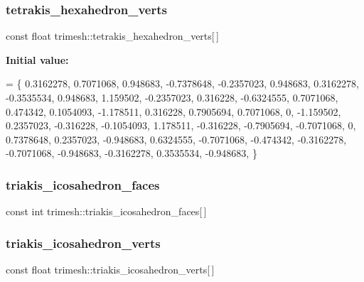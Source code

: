 \subsubsection{\texorpdfstring{tetrakis\+\_\+hexahedron\+\_\+verts}{tetrakis\_hexahedron\_verts}}
{\footnotesize\ttfamily const float trimesh\+::tetrakis\+\_\+hexahedron\+\_\+verts\mbox{[}$\,$\mbox{]}\hspace{0.3cm}{\ttfamily [static]}}

{\bfseries Initial value\+:}
\begin{DoxyCode}
= \{
    0.3162278, 0.7071068, 0.948683,
    -0.7378648, -0.2357023, 0.948683,
    0.3162278, -0.3535534, 0.948683,
    1.159502, -0.2357023, 0.316228,
    -0.6324555, 0.7071068, 0.474342,
    0.1054093, -1.178511, 0.316228,
    0.7905694, 0.7071068, 0,
    -1.159502, 0.2357023, -0.316228,
    -0.1054093, 1.178511, -0.316228,
    -0.7905694, -0.7071068, 0,
    0.7378648, 0.2357023, -0.948683,
    0.6324555, -0.7071068, -0.474342,
    -0.3162278, -0.7071068, -0.948683,
    -0.3162278, 0.3535534, -0.948683,
\}
\end{DoxyCode}
\mbox{\label{namespacetrimesh_a108650043dfd7227ad2df2c75963c957}} 
\subsubsection{\texorpdfstring{triakis\+\_\+icosahedron\+\_\+faces}{triakis\_icosahedron\_faces}}
{\footnotesize\ttfamily const int trimesh\+::triakis\+\_\+icosahedron\+\_\+faces\mbox{[}$\,$\mbox{]}\hspace{0.3cm}{\ttfamily [static]}}

\mbox{\label{namespacetrimesh_acb298922bb8eec3d90a2d866cb4e58a3}} 
\subsubsection{\texorpdfstring{triakis\+\_\+icosahedron\+\_\+verts}{triakis\_icosahedron\_verts}}
{\footnotesize\ttfamily const float trimesh\+::triakis\+\_\+icosahedron\+\_\+verts\mbox{[}$\,$\mbox{]}\hspace{0.3cm}{\ttfamily [static]}}

